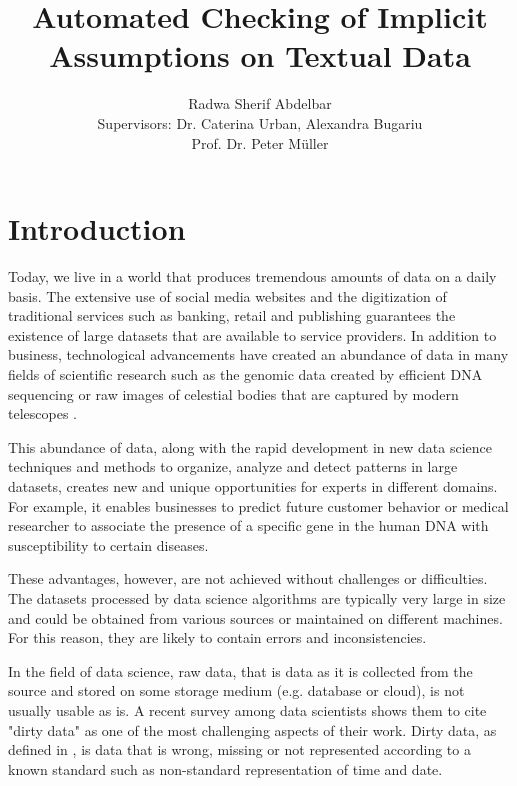 \documentclass[10pt]{report}
\title{Automated Checking of Implicit Assumptions on Textual Data}
\author{Radwa Sherif Abdelbar \\
	 Supervisors: Dr. Caterina Urban, Alexandra Bugariu \\ Prof. Dr. Peter M{\"u}ller}
\begin{document}
\maketitle



\begin{abstract}

\end{abstract}

\chapter{Introduction}

Today, we live in a world that produces tremendous amounts of data on a daily basis. The extensive use of social media websites and the digitization of traditional services such as banking, retail and publishing guarantees the existence of large datasets that are available to service providers. In addition to business, technological advancements have created an abundance of data in many fields of scientific research such as the genomic data created by efficient DNA sequencing or raw images of celestial bodies that are captured by modern telescopes \cite{blei2017science}. 

This abundance of data, along with the rapid development in new data science techniques and methods to organize, analyze and detect patterns in large datasets, creates new and unique opportunities for experts in different domains. For example, it enables businesses to predict future customer behavior or medical researcher to associate the presence of a specific gene in the human DNA with susceptibility to certain diseases. 

These advantages, however, are not achieved without challenges or difficulties. The datasets processed by data science algorithms are typically very large in size and could be obtained from various sources or maintained on different machines. For this reason, they are likely to contain errors and inconsistencies. 

In the field of data science, raw data, that is data as it is collected from the source and stored on some storage medium (e.g. database or cloud), is not usually usable as is. A recent survey among data scientists \cite{kaggle} shows them to cite "dirty data" as one of the most challenging aspects of their work. Dirty data, as defined in \cite{dirty-data}, is data that is wrong, missing or not represented according to a known standard such as non-standard representation of time and date.
\end{document}
